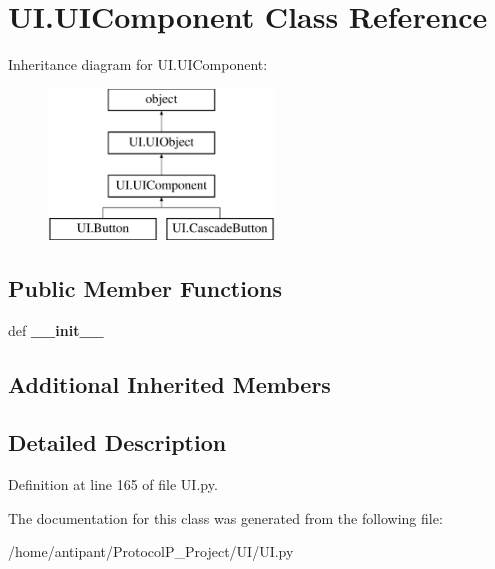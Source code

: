 \hypertarget{classUI_1_1UIComponent}{\section{U\-I.\-U\-I\-Component Class Reference}
\label{classUI_1_1UIComponent}
}
Inheritance diagram for U\-I.\-U\-I\-Component\-:\begin{figure}[H]
\begin{center}
\leavevmode
\includegraphics[height=4.000000cm]{classUI_1_1UIComponent}
\end{center}
\end{figure}
\subsection*{Public Member Functions}
\begin{DoxyCompactItemize}
\item 
\hypertarget{classUI_1_1UIComponent_a8c0d5fe4e1f297409fa4cc257c088457}{def {\bfseries \-\_\-\-\_\-init\-\_\-\-\_\-}}\label{classUI_1_1UIComponent_a8c0d5fe4e1f297409fa4cc257c088457}

\end{DoxyCompactItemize}
\subsection*{Additional Inherited Members}


\subsection{Detailed Description}


Definition at line 165 of file U\-I.\-py.



The documentation for this class was generated from the following file\-:\begin{DoxyCompactItemize}
\item 
/home/antipant/\-Protocol\-P\-\_\-\-Project/\-U\-I/U\-I.\-py\end{DoxyCompactItemize}
